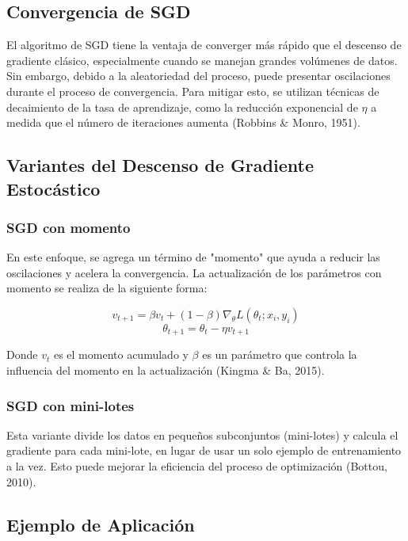 \documentclass[12pt]{article}
\begin{document}
	\subsection*{Convergencia de SGD}
	
	El algoritmo de SGD tiene la ventaja de converger más rápido que el descenso de gradiente clásico, especialmente cuando se manejan grandes volúmenes de datos. Sin embargo, debido a la aleatoriedad del proceso, puede presentar oscilaciones durante el proceso de convergencia. Para mitigar esto, se utilizan técnicas de decaimiento de la tasa de aprendizaje, como la reducción exponencial de \( \eta \) a medida que el número de iteraciones aumenta (Robbins \& Monro, 1951).
	
	\subsection*{Variantes del Descenso de Gradiente Estocástico}
	
	\subsubsection*{SGD con momento}
	
	En este enfoque, se agrega un término de "momento" que ayuda a reducir las oscilaciones y acelera la convergencia. La actualización de los parámetros con momento se realiza de la siguiente forma:
	
	\[
	v_{t+1} = \beta v_t + (1 - \beta) \nabla_{\theta} L(\theta_t; x_i, y_i)
	\]
	\[
	\theta_{t+1} = \theta_t - \eta v_{t+1}
	\]
	
	Donde \( v_t \) es el momento acumulado y \( \beta \) es un parámetro que controla la influencia del momento en la actualización (Kingma \& Ba, 2015).
	
	\subsubsection*{SGD con mini-lotes}
	
	Esta variante divide los datos en pequeños subconjuntos (mini-lotes) y calcula el gradiente para cada mini-lote, en lugar de usar un solo ejemplo de entrenamiento a la vez. Esto puede mejorar la eficiencia del proceso de optimización (Bottou, 2010).
	
	
	\subsection*{Ejemplo de Aplicación}
	
\end{document}
